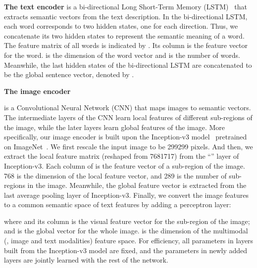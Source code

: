 \documentclass[10pt,twocolumn,letterpaper]{article}
\begin{document}
\textbf{The text encoder }{
is a bi-directional Long Short-Term Memory (LSTM)~\cite{SchusterP97} that extracts semantic vectors from the text description. In the bi-directional LSTM, each word corresponds to two hidden states, one for each direction. Thus, we concatenate its two hidden states to represent the semantic meaning of a word. The feature matrix of all words is indicated by . Its  column  is the feature vector for the  word.  is the dimension of the word vector and  is the number of words. Meanwhile, the last hidden states of the bi-directional LSTM are concatenated to be the global sentence vector, denoted by . 
} 


\textbf{The image encoder }{
is a Convolutional Neural Network (CNN) that maps images to semantic vectors. The intermediate layers of the CNN learn local features of different sub-regions of the image, while the later layers learn global features of the image. More specifically, our image encoder is built upon the Inception-v3 model~\cite{SzegedyVISW16} pretrained on ImageNet~\cite{ILSVRC15}. We first rescale the input image to be 299299 pixels. And then, we extract the local feature matrix  (reshaped from 7681717) from the ``'' layer of Inception-v3. Each column of  is the feature vector of a sub-region of the image. 768 is the dimension of the local feature vector, and 289 is the number of sub-regions in the image. Meanwhile, the global feature vector  is extracted from the last average pooling layer of Inception-v3. Finally, we convert the image features to a common semantic space of text features by adding a perceptron layer: 

where  and its  column  is the visual feature vector for the  sub-region of the image; and  is the global vector for the whole image.  is the dimension of the multimodal (\ie, image and text modalities) feature space. For efficiency, all parameters in layers built from the Inception-v3 model are fixed, and the parameters in newly added layers are jointly learned with the rest of the network. 
}
\end{document}
